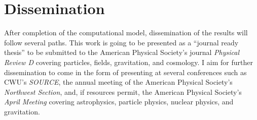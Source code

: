 \documentclass{article}
\begin{document}

        
    \section{Dissemination}

        After completion of the computational model, dissemination of the results will follow several paths.  This work is going to be presented as a ``journal ready thesis'' to be submitted to the American Physical Society's journal \textit{Physical Review D} covering particles, fields, gravitation, and cosmology.  I aim for further dissemination to come in the form of presenting at several conferences such as CWU's \textit{SOURCE}, the annual meeting of the American Physical Society's \textit{Northwest Section}, and, if resources permit, the American Physical Society's \textit{April Meeting} covering astrophysics, particle physics, nuclear physics, and gravitation.
    
    \pagebreak
    \nocite{*}
    \printbibliography
\end{document}
